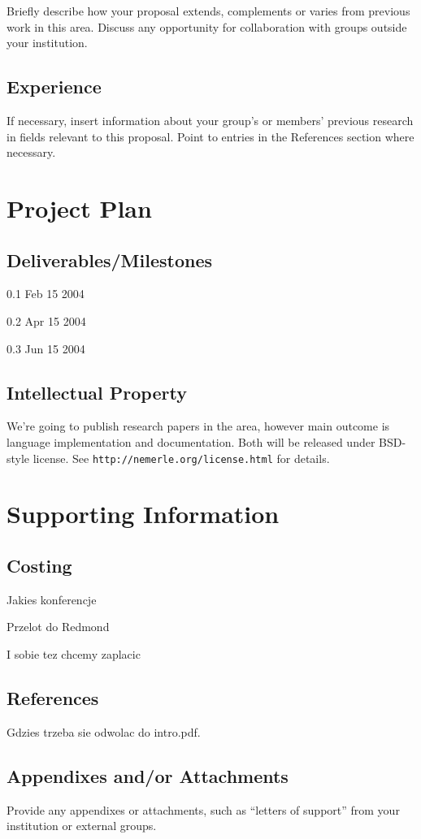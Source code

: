 \documentclass[a4paper,11pt]{article}
\begin{document}
Briefly describe how your proposal extends, complements or varies from
previous work in this area. Discuss any opportunity for collaboration
with groups outside your institution.


\subsection{Experience}

If necessary, insert information about your group's or members' previous
research in fields relevant to this proposal. Point to entries in the
References section where necessary.

\section{Project Plan}

\subsection{Deliverables/Milestones}

0.1 Feb 15 2004

0.2 Apr 15 2004

0.3 Jun 15 2004

\subsection{Intellectual Property}

We're going to publish research papers in the area, however main outcome
is language implementation and documentation. Both will be released
under BSD-style license. See \texttt{http://nemerle.org/license.html}
for details.


\section{Supporting Information}


\subsection{Costing}

Jakies konferencje

Przelot do Redmond

I sobie tez chcemy zaplacic


\subsection{References}

Gdzies trzeba sie odwolac do intro.pdf.


\subsection{Appendixes and/or Attachments}

Provide any appendixes or attachments, such as ``letters of support''
from your institution or external groups.
\end{document}
